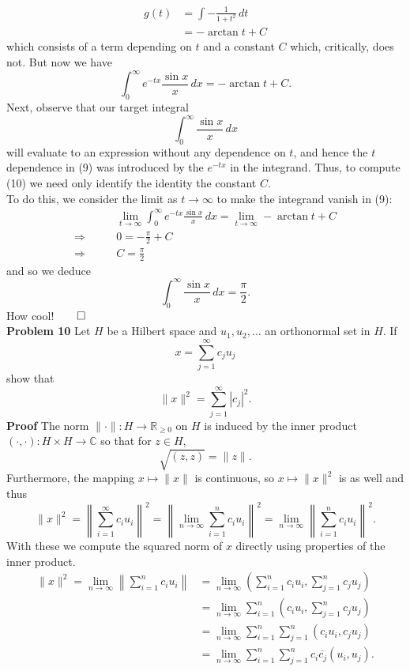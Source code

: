 \documentclass[11pt, letterpaper]{article}
\newcommand{\mbb}[1]{\mathbb{#1}}
\begin{document}
    \begin{align*}
        g(t)&=\int-\frac{1}{1+t^2}\,dt\\
        &=-\arctan t+C
    \end{align*}
    which consists of a term depending on $t$ and a constant $C$ which, critically, does not. But now we have
    \[\int_0^\infty e^{-tx}\frac{\sin x}{x}\,dx=-\arctan t+C.\tag{9}\]
    Next, observe that our target integral
    \[\int_0^\infty\frac{\sin x}{x}\,dx\tag{10}\]
    will evaluate to an expression without any dependence on $t$, and hence the $t$ dependence in (9) was introduced by the $e^{-tx}$ in the integrand. Thus, to compute (10) we need only identify the identity the constant $C$.\\[10pt]
    To do this, we consider the limit as $t\rightarrow\infty$ to make the integrand vanish in (9):
    \begin{align*}
        &\lim_{t\rightarrow\infty}\int_0^\infty e^{-tx}\frac{\sin x}{x}\,dx=\lim_{t\rightarrow\infty}-\arctan t+C\\
        \Rightarrow\qquad&0=-\frac{\pi}{2}+C\\
        \Rightarrow\qquad&C=\frac{\pi}{2}
    \end{align*}
    and so we deduce
    \[\int_0^\infty\frac{\sin x}{x}\,dx=\frac{\pi}{2}.\]
    How cool!\hfill{$\qed$}\\[10pt]
    {\bf Problem 10} Let $H$ be a Hilbert space and $u_1,u_2,\dots$ an orthonormal set in $H$. If
    \[x=\sum_{j=1}^\infty c_ju_j\]
    show that
    \[\|x\|^2=\sum_{j=1}^\infty|c_j|^2.\]
    {\bf Proof} The norm $\|\cdot\|:H\rightarrow\mbb{R}_{\geq 0}$ on $H$ is induced by the inner product $(\cdot,\cdot):H\times H\rightarrow\mbb{C}$ so that for $z\in H$,
    \[\sqrt{(z,z)}=\|z\|.\]
    Furthermore, the mapping $x\mapsto\|x\|$ is continuous, so $x\mapsto\|x\|^2$ is as well and thus
    \[\|x\|^2=\left\|\sum_{i=1}^\infty c_iu_i\right\|^2=\left\|\lim_{n\rightarrow\infty}\sum_{i=1}^nc_iu_i\right\|^2=\lim_{n\rightarrow\infty}\left\|\sum_{i=1}^nc_iu_i\right\|^2.\]
    With these we compute the squared norm of $x$ directly using properties of the inner product.
    \begin{align*}
        \|x\|^2=\lim_{n\rightarrow\infty}\left\|\sum_{i=1}^nc_iu_i\right\|&=\lim_{n\rightarrow\infty}\left(\sum_{i=1}^nc_iu_i,\sum_{j=1}^nc_ju_j\right)\\
        &=\lim_{n\rightarrow\infty}\sum_{i=1}^n\left(c_iu_i,\sum_{j=1}^n c_ju_j\right)\tag{linearity in the first argument}\\
        &=\lim_{n\rightarrow\infty}\sum_{i=1}^n\sum_{j=1}^n(c_iu_i,c_ju_j)\tag{linearity in the second argument}\\
        &=\lim_{n\rightarrow\infty}\sum_{i=1}^n\sum_{j=1}^n c_i\overline{c_j}(u_i,u_j).\tag{homogeneity/conjugate homogeneity}
    \end{align*}
\end{document}
